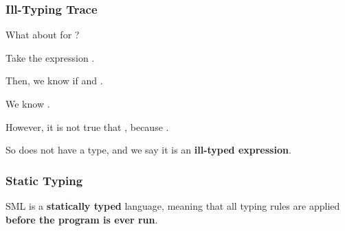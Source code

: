 \documentclass[aspectratio=169]{beamer}
\begin{document}
\begin{frame}[plain]
  \frametitle{Ill-Typing Trace}

  What about for ?

  \pause
  \vspace{\fill}


  \pause
  \vspace{\fill}

  Take the expression . 

  \pause
  \vspace{\fill}

  Then, we know  if  and .

  \pause
  \vspace{3pt}

  We know .

  \pause
  \vspace{3pt}

  However, it is not true that , because .

  \pause
  \vspace{\fill}

  So  does not have a type, and we say it is an \textbf{ill-typed expression}.
\end{frame}


\begin{frame}[plain]
  \frametitle{Static Typing}

  SML is a \textbf{statically typed} language, meaning that all typing rules are applied
  \textbf{before the program is ever run}.

  \pause
  \vspace{\fill}


  \pause
  \vspace{\fill}

\end{frame}
\end{document}
